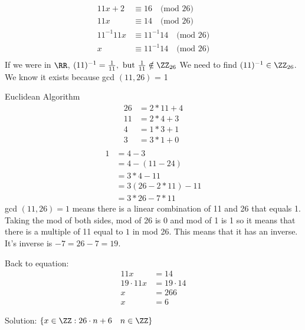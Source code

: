 \documentclass[class=scrartcl, crop=false]{standalone}
\begin{document}
\begin{example}
  \begin{align*}
    11x + 2 & \equiv 16 \quad \text{(mod 26)} \\
    11x & \equiv 14 \quad \text{(mod 26)} \\
    11^{-1}11x & \equiv 11^{-1}14 \quad \text{(mod 26)} \\
    x & \equiv 11^{-1}14 \quad \text{(mod 26)} \\
  \end{align*}
  If we were in $\RR$, $(11)^{-1} = \frac{1}{11}, \ \text{but} \ \frac{1}{11} \notin \ZZ_{26}$ 
  We need to find $(11)^{-1} \in \ZZ_{26}$. We know it exists because  gcd $(11, 26)$ = 1

  Euclidean Algorithm
  \begin{align*}
    26 & = 2 * 11 + 4 \\
    11 & = 2 * 4 + 3 \\
    4 & = 1 * 3 + 1 \\
    3 & = 3 * 1 + 0 \\
  \end{align*}
  \begin{align*}
    1 & = 4 - 3 \\
      & = 4 - (11 - 24) \\
      & = 3 * 4 - 11 \\
      & = 3 (26 - 2 * 11) - 11 \\
      & = 3 * 26 - 7 * 11 
  \end{align*}
  gcd $(11, 26) = 1$  means there is a linear combination of 11 and 26 that equals 1. Taking the mod of both sides, mod of 26 is 0 and mod of 1 is 1 so it means that there is a multiple of 11 equal to $1$ in mod 26. This means that it has an inverse. It's inverse is $-7 = 26 - 7 = 19$.

  Back to equation:
  \begin{align*}
    11x & = 14 \\
    19 \cdot 11x & = 19 \cdot 14 \\
    x & = 266 \\
    x & = 6
  \end{align*}

  Solution:
  $\{x \in \ZZ: 26 \cdot n + 6 \quad n \in \ZZ\}$

\end{example}
\end{document}
